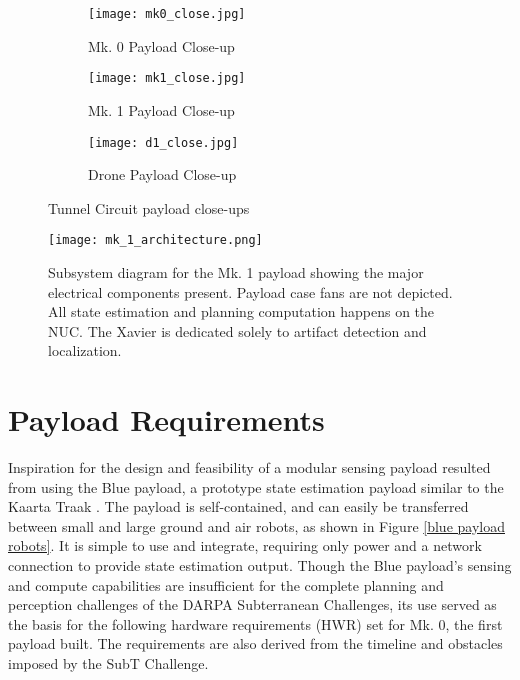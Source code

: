\begin{figure}
	\centering
	\begin{subfigure}{0.32\textwidth}
		\texttt{[image: mk0\_close.jpg]}
		\caption{Mk. 0 Payload Close-up}
		\label{mk0_close}
	\end{subfigure}		
	\hfill
	\begin{subfigure}{0.32\textwidth}
		\texttt{[image: mk1\_close.jpg]}
		\caption{Mk. 1 Payload Close-up}
		\label{mk1_close}		
	\end{subfigure}
	\hfill
	\begin{subfigure}{0.32\textwidth}
		\texttt{[image: d1\_close.jpg]}
		\caption{Drone Payload Close-up}
		\label{drone_closeup}
	\end{subfigure}	
	\caption{Tunnel Circuit payload close-ups}
	\label{payloads}
\end{figure}


\begin{figure}
	\centering
	\texttt{[image: mk\_1\_architecture.png]}
	\caption[Subsystem diagram for Mk. 1 payload]{Subsystem diagram for the Mk. 1 payload showing the major electrical components present. Payload case fans are not depicted. All state estimation and planning computation happens on the NUC. The Xavier is dedicated solely to artifact detection and localization.}
	\label{mk_1_architecture}
\end{figure}

\section{Payload Requirements}

Inspiration for the design and feasibility of a modular sensing payload resulted from using the Blue payload, a prototype state estimation payload similar to the Kaarta Traak \cite{kaarta_traak}. The payload is self-contained, and can easily be transferred between small and large ground and air robots, as shown in Figure \ref{blue payload robots}. It is simple to use and integrate, requiring only power and a network connection to provide state estimation output. Though the Blue payload's sensing and compute capabilities are insufficient for the complete planning and perception challenges of the DARPA Subterranean Challenges, its use served as the basis for the following hardware requirements (HWR) set for Mk. 0, the first payload built. The requirements are also derived from the timeline and obstacles imposed by the SubT Challenge.

